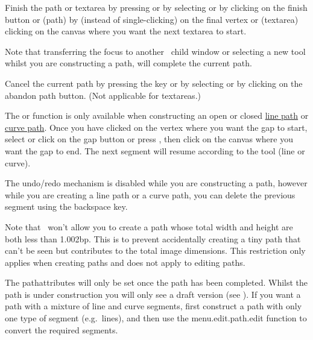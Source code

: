 
Finish the \gls{path} or \gls{textarea} by pressing
 or by selecting 
or by clicking on the finish button or (\gls{path}) by
 (instead of single-clicking)
on the final vertex or (\gls{textarea}) clicking on the \gls{canvas}
where you want the next \gls{textarea} to start.  

Note that transferring the focus to
another \FlowframTk\ child window or selecting a new tool whilst you
are constructing a \gls{path}, will complete the current path.


Cancel the current \gls{path} by pressing the
 key or by selecting
 or by clicking on the abandon path button.
(Not applicable for \glspl{textarea}.)


The  or  function is only
available when constructing an open or closed
\hyperref[sec:newlinepath]{line path} or \hyperref[sec:newcurvepath]{curve
path}.  Once you have clicked on the vertex where you want the
\gls{gap} to start, select  or click on the
\gls{gap} button or press , then click
on the \gls{canvas} where you want the \gls{gap} to end. The next
segment will resume according to the tool (line or curve).

\begin{warning}
The undo/redo mechanism is disabled while you are constructing a
path, however while you are creating a line path or a curve path,
you can delete the previous segment using the
backspace  key.
\end{warning}

Note that \FlowframTk\ won't allow you to create a \gls{path} whose
total width and height are both less than 1.002\gls{bp}. This is to
prevent accidentally creating a tiny path that can't be seen but
contributes to the total image dimensions. This restriction only
applies when creating \glspl*{path} and does not apply to editing
paths.

The \gls{pathattributes} will only be set
once the \gls{path} has been completed. Whilst the
\gls{path} is under construction you will
only see a draft version (see ).
If you want a \gls{path} with a mixture of line and curve
segments, first construct a \gls{path} with only one
type of segment (e.g.\ lines), and then use the
\gls{menu.edit.path.edit} function to convert
the required segments.

